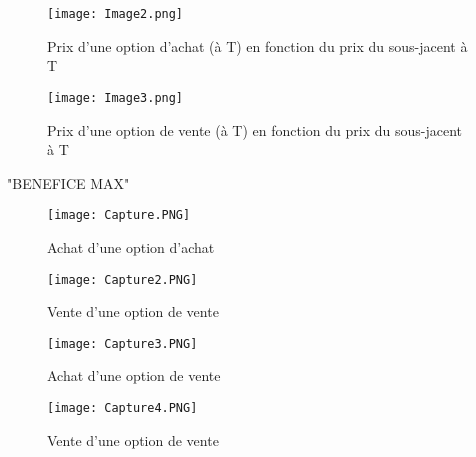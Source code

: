 \documentclass{report}
\begin{document}

\begin{figure}[h!]
    \begin{minipage}[c]{.46\linewidth}
        \centering
        \texttt{[image: Image2.png]}
        \caption{Prix d’une option d’achat (à T) en fonction du prix du sous-jacent à T}
    \end{minipage}
    \hfill%
    \begin{minipage}[c]{.46\linewidth}
        \centering
        \texttt{[image: Image3.png]}
        \caption{Prix d’une option de vente (à T) en fonction du prix du sous-jacent à T}
    \end{minipage}
\end{figure}

\vspace{3cm}
"BENEFICE MAX"

\begin{figure}[h!]
    \begin{minipage}[c]{.46\linewidth}
        \centering
        \texttt{[image: Capture.PNG]}
        \caption{Achat d'une option d'achat}
    \end{minipage}
    \hfill%
    \begin{minipage}[c]{.46\linewidth}
        \centering
        \texttt{[image: Capture2.PNG]}
        \caption{Vente d'une option de vente}
    \end{minipage}
\end{figure}
\begin{figure}[h!]
    \begin{minipage}[c]{.46\linewidth}
        \centering
        \texttt{[image: Capture3.PNG]}
        \caption{Achat d'une option de vente}
    \end{minipage}
    \hfill%
    \begin{minipage}[c]{.46\linewidth}
        \centering
        \texttt{[image: Capture4.PNG]}
        \caption{Vente d'une option de vente}
    \end{minipage}
\end{figure}
\end{document}
